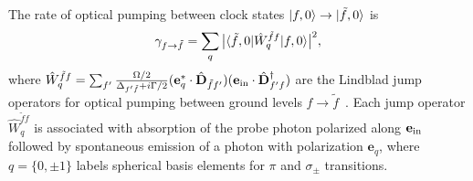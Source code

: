 \documentclass[preprint, aps,pra,onecolumn]{revtex4-1} %
\begin{document}
\begin{appendix}
The rate of optical pumping between clock states $\lvert{f,0}\rangle \rightarrow \lvert{\tilde{f},0}\rangle$ is
	\begin{equation}\label{Eq::gammaff}
		\gamma_{f \rightarrow \tilde{f} } 
		=\sum_{q}\big| \langle{\tilde{f},0}\rvert \hat{W}_q^{\tilde{f}f} \lvert{f,0}\rangle \big|^2,
	\end{equation}
where $ \hat{W}_q^{\tilde{f}f} = \sum_{f'}\frac{\Omega/2}{\Delta_{f'\tilde{f}}+i\Gamma/2}(\mathbf{e}_q^*\cdot\hat{\mathbf{D}}_{\tilde{f} f'} )(\mathbf{e}_{\rm in}\cdot \hat{\mathbf{D}}^\dagger_{f'f} ) $ are the Lindblad jump operators for optical pumping between ground levels $ f\rightarrow \tilde{f} $~\cite{deutsch_quantum_2010}. 
Each jump operator $\hat{W}_q^{\tilde{f}f}$ is associated with absorption of the probe photon polarized along $ \mathbf{e}_{\rm in} $ followed by spontaneous emission of a photon with polarization $ \mathbf{e}_q $, where $q= \{0,\pm 1\}$ labels spherical basis elements for $\pi$ and $ \sigma_\pm$ transitions.  


\end{appendix}
\end{document}
